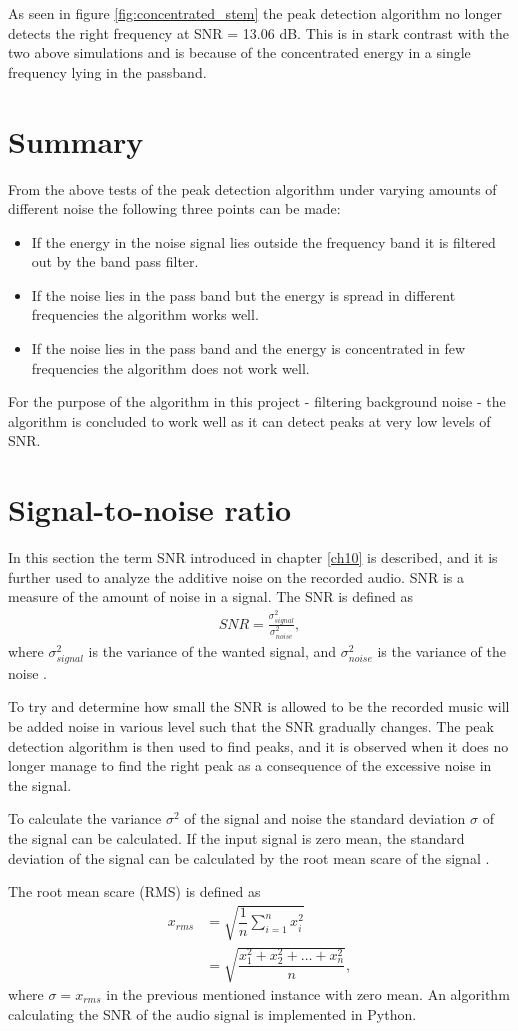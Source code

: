 As seen in figure \ref{fig:concentrated_stem} the peak detection algorithm no longer detects the right frequency at SNR = 13.06 dB. This is in stark contrast with the two above simulations and is because of the concentrated energy in a single frequency lying in the passband.

\section{Summary}
From the above tests of the peak detection algorithm under varying amounts of different noise the following three points can be made:
\begin{itemize}
\item If the energy in the noise signal lies outside the frequency band it is filtered out by the band pass filter.
\item If the noise lies in the pass band but the energy is spread in different frequencies the algorithm works well.
\item If the noise lies in the pass band and the energy is concentrated in few frequencies the algorithm does not work well.
\end{itemize}
For the purpose of the algorithm in this project - filtering background noise - the algorithm is concluded to work well as it can detect peaks at very low levels of SNR.

\section{Signal-to-noise ratio}
In this section the term SNR introduced in chapter \ref{ch10} is described, and it is further used to analyze the additive noise on the recorded audio.
SNR is a measure of the amount of noise in a signal. 
The SNR is defined as
\begin{align} \label{eq:SNR}
	SNR=\frac{\sigma_{signal}^2}{\sigma_{noise}^2},
\end{align}
where $\sigma_{signal}^2$ is the variance of the wanted signal, and $\sigma_{noise}^2$ is the variance of the noise \cite{page 228, DTSP}.

To try and determine how small the SNR is allowed to be the recorded music will be added noise in various level such that the SNR gradually changes.
The peak detection algorithm is then used to find peaks, and it is observed when it does no longer manage to find the right peak as a consequence of the excessive noise in the signal.

To calculate the variance $\sigma^2$ of the signal and noise the standard deviation $\sigma$ of the signal can be calculated. 
If the input signal is zero mean, the standard deviation of the signal can be calculated by the root mean scare of the signal \cite{page 228, DTSP}.

The root mean scare (RMS) is defined as
\begin{align*}
	x_{rms} 
	&=\sqrt{\dfrac{1}{n} \sum_{i=1}^n x_i^2}\\
	&= \sqrt{\dfrac{x_1^2 + x_2^2 + \dots + x_n^2}{n}},
\end{align*}
where $\sigma = x_{rms}$ in the previous mentioned instance with zero mean. An algorithm calculating the SNR of the audio signal is implemented in Python.